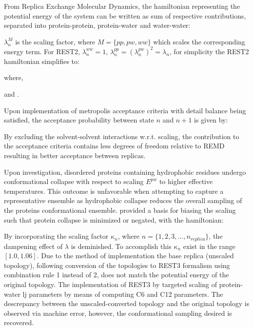 From Replica Exchange Molecular Dynamics\cite{Sugita1999}, the hamiltonian representing the potential energy of the system can be written as sum of respective contributions, separated into protein-protein, protein-water and water-water:


$\lambda_{n}^M$ is the scaling factor, where $M=\{ pp, pw, ww\}
$ which scales the corresponding energy term. For REST2\cite{Wang2011}, $\lambda_n^{ww}=1$, $\lambda_n^{pp}=(\lambda_n^{pw})^2=\lambda_n$, for simplicity the REST2 hamiltonian simplifies to:

where,

and . 

Upon implementation of metropolis acceptance criteria with detail balance being satisfied, the acceptance probability between state $n$ and $n+1$ is given by:


By excluding the solvent-solvent interactions w.r.t. scaling, the contribution to the acceptance criteria contains less degrees of freedom relative to REMD resulting in better acceptance between replicas.

Upon investigation, disordered proteins containing hydrophobic residues undergo conformational collapse with respect to scaling  $E^{pw}$ to higher effective temperatures. 
This outcome is unfavorable when attempting to capture a representative ensemble as hydrophobic collapse reduces the overall sampling of the proteins conformational ensemble. %
\citeauthor{Zhang2023} \citeyear{Zhang2023} provided a basis for biasing the scaling such that protein collapse is minimized or negated, with the hamiltonian:


By incorporating the scaling factor $\kappa_n$, where $n=\{1,2,3,\ldots,n_{replica}\}$, the dampening effect of $\lambda$ is deminished. 
To accomplish this $\kappa_n$ exist in the range $[1.0,1.06]$. 
Due to the method of implementation the base replica (unscaled topology), following conversion of the topologies to REST3 \cite{Zhang2023} formalism using combination rule 1 instead of 2, does not match the potential energy of the original topology. 
The implementation of REST3 by \citeauthor{Zhang2023} targeted scaling of protein-water lj parameters by means of computing C6 and C12 parameters. 
The descrepancy between the unscaled-converted topology and the original topology is observed via machine error, however, the conformational sampling desired is recovered.

